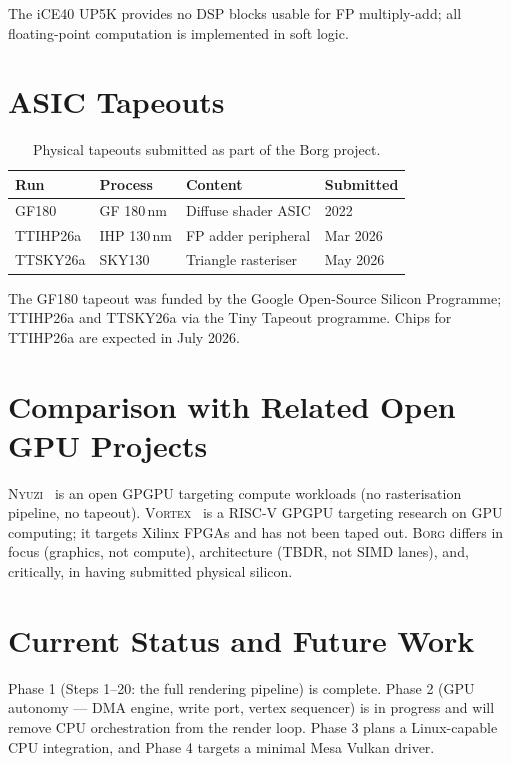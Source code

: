 \documentclass[sigconf,review,natbib=false]{acmart}
\begin{document}
The iCE40 UP5K provides no DSP blocks usable for FP multiply-add;
all floating-point computation is implemented in soft logic.

\section{ASIC Tapeouts}

\begin{table}[h]
  \centering
  \caption{Physical tapeouts submitted as part of the Borg project.}
  \begin{tabular}{@{}llll@{}}
    \toprule
    Run & Process & Content & Submitted \\
    \midrule
    GF180    & GF 180\,nm   & Diffuse shader ASIC    & 2022 \\
    TTIHP26a & IHP 130\,nm  & FP adder peripheral    & Mar 2026 \\
    TTSKY26a & SKY130       & Triangle rasteriser    & May 2026 \\
    \bottomrule
  \end{tabular}
\end{table}

The GF180 tapeout was funded by the Google Open-Source Silicon Programme;
TTIHP26a and TTSKY26a via the Tiny Tapeout programme.
Chips for TTIHP26a are expected in July 2026.

\section{Comparison with Related Open GPU Projects}

\textsc{Nyuzi}~\cite{Bush2015Nyuzi} is an open GPGPU targeting compute
workloads (no rasterisation pipeline, no tapeout).
\textsc{Vortex}~\cite{Vortex2021} is a RISC-V GPGPU targeting research
on GPU computing; it targets Xilinx FPGAs and has not been taped out.
\textsc{Borg} differs in focus (graphics, not compute),
architecture (TBDR, not SIMD lanes), and,
critically, in having submitted physical silicon.

\section{Current Status and Future Work}

Phase 1 (Steps 1–20: the full rendering pipeline) is complete.
Phase 2 (GPU autonomy — DMA engine, write port, vertex sequencer)
is in progress and will remove CPU orchestration from the render loop.
Phase 3 plans a Linux-capable CPU integration, and Phase 4 targets
a minimal Mesa Vulkan driver.
\end{document}
